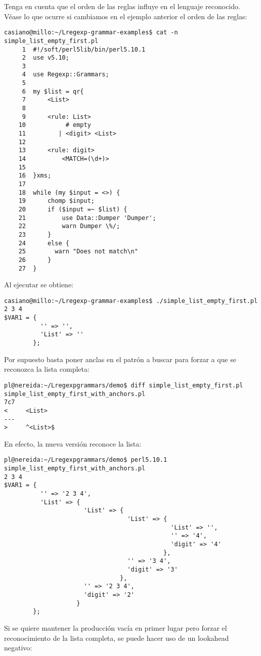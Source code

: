Tenga en cuenta que el orden de las reglas
influye en el lenguaje reconocido. Véase lo que ocurre si cambiamos 
en el ejemplo anterior el orden de las reglas:
\begin{verbatim}
casiano@millo:~/Lregexp-grammar-examples$ cat -n simple_list_empty_first.pl
     1  #!/soft/perl5lib/bin/perl5.10.1
     2  use v5.10;
     3
     4  use Regexp::Grammars;
     5
     6  my $list = qr{
     7      <List>
     8
     9      <rule: List>
    10           # empty
    11         | <digit> <List>
    12
    13      <rule: digit>
    14          <MATCH=(\d+)>
    15
    16  }xms;
    17
    18  while (my $input = <>) {
    19      chomp $input;
    20      if ($input =~ $list) {
    21          use Data::Dumper 'Dumper';
    22          warn Dumper \%/;
    23      }
    24      else {
    25        warn "Does not match\n"
    26      }
    27  }
\end{verbatim}
Al ejecutar se obtiene:
\begin{verbatim}
casiano@millo:~/Lregexp-grammar-examples$ ./simple_list_empty_first.pl
2 3 4
$VAR1 = {
          '' => '',
          'List' => ''
        };
\end{verbatim}

Por supuesto basta poner anclas en el patrón a buscar para forzar a que se reconozca
la lista completa:
\begin{verbatim}
pl@nereida:~/Lregexpgrammars/demo$ diff simple_list_empty_first.pl simple_list_empty_first_with_anchors.pl
7c7
<     <List>
---
>     ^<List>$
\end{verbatim}
En efecto, la nueva versión reconoce la lista:
\begin{verbatim}
pl@nereida:~/Lregexpgrammars/demo$ perl5.10.1 simple_list_empty_first_with_anchors.pl
2 3 4
$VAR1 = {
          '' => '2 3 4',
          'List' => {
                      'List' => {
                                  'List' => {
                                              'List' => '',
                                              '' => '4',
                                              'digit' => '4'
                                            },
                                  '' => '3 4',
                                  'digit' => '3'
                                },
                      '' => '2 3 4',
                      'digit' => '2'
                    }
        };
\end{verbatim}

Si se quiere mantener la producción vacía en primer lugar 
pero forzar el reconocimiento de la lista completa, se puede
hacer uso de un lookahead negativo:

